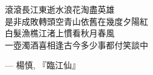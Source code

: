 \thispagestyle{empty}
\begin{center}
\begin{flushleft}
{\Large \vspace{3em} 滾滾長江東逝水\hspace{1em}浪花淘盡英雄\\
是非成敗轉頭空\hspace{1em}青山依舊在\hspace{1em}幾度夕陽紅\\
白髮漁樵江渚上\hspace{1em}慣看秋月春風\\
一壺濁酒喜相逢\hspace{1em}古今多少事\hspace{1em}都付笑談中\\}
\end{flushleft}
\end{center}
\begin{flushright}
--- 楊慎, 『臨江仙』
\end{flushright}

\setlength{\abovedisplayskip}{-5pt}
\setlength{\abovedisplayshortskip}{-5pt}

